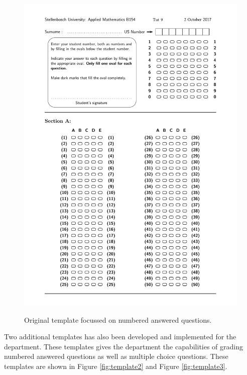 \begin{figure}
  \centering
  \includegraphics[width=12cm]{template1}\\
  \caption{Original template focussed on numbered answered questions.}
  \label{fig:template1}
\end{figure}

Two additional templates has also been developed and implemented for the department. These templates gives the department the capabilities of grading numbered answered questions as well as multiple choice questions. These templates are shown in Figure \ref{fig:template2} and Figure \ref{fig:template3}.

